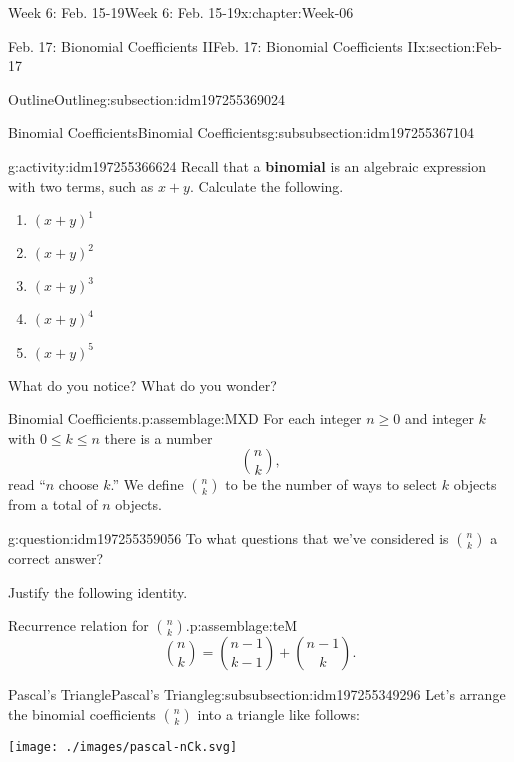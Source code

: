\documentclass[oneside,10pt,]{book}
\newcommand{\terminology}[1]{\textbf{#1}}
\numberwithin{equation}{section}
\renewcommand{\le}{\leqslant}
\renewcommand{\ge}{\geqslant}
\begin{document}
\begin{chapterptx}{Week 6: Feb. 15-19}{}{Week 6: Feb. 15-19}{}{}{x:chapter:Week-06}
\begin{sectionptx}{Feb. 17: Bionomial Coefficients II}{}{Feb. 17: Bionomial Coefficients II}{}{}{x:section:Feb-17}
\begin{subsectionptx}{Outline}{}{Outline}{}{}{g:subsection:idm197255369024}
\begin{subsubsectionptx}{Binomial Coefficients}{}{Binomial Coefficients}{}{}{g:subsubsection:idm197255367104}
\begin{activity}{}{g:activity:idm197255366624}%
Recall that a \terminology{binomial} is an algebraic expression with two terms, such as \(x+y\). Calculate the following.%
%
\begin{enumerate}
\item{}\(\displaystyle (x+y)^1\)%
\item{}\(\displaystyle (x+y)^2\)%
\item{}\(\displaystyle (x+y)^3\)%
\item{}\(\displaystyle (x+y)^4\)%
\item{}\(\displaystyle (x+y)^5\)%
\end{enumerate}
What do you notice? What do you wonder?%
\end{activity}%
\begin{assemblage}{Binomial Coefficients.}{p:assemblage:MXD}%
For each integer \(n \ge 0\) and integer \(k\) with \(0 \le k \le n\) there is a number%
\begin{equation*}
{n\choose k}\text{,}
\end{equation*}
read ``\(n\) choose \(k\).'' We define \({n \choose k}\) to be the number of ways to select \(k\) objects from a total of \(n\) objects.%
\end{assemblage}
\begin{question}{}{g:question:idm197255359056}%
To what questions that we've considered is \(\binom{n}{k}\) a correct answer?%
\end{question}
Justify the following identity.%
\begin{assemblage}{Recurrence relation for \({n \choose k}\).}{p:assemblage:teM}%
%
\begin{equation*}
{n \choose k} = {n-1 \choose k-1} + {n-1 \choose k}\text{.}
\end{equation*}
%
\end{assemblage}
\end{subsubsectionptx}
%
%
\typeout{************************************************}
\typeout{************************************************}
%
\begin{subsubsectionptx}{Pascal's Triangle}{}{Pascal's Triangle}{}{}{g:subsubsection:idm197255349296}
Let's arrange the binomial coefficients \({n \choose k}\) into a triangle like follows:%
\begin{sidebyside}{1}{0.15}{0.15}{0}%
\begin{sbspanel}{0.7}%
\texttt{[image: ./images/pascal-nCk.svg]}
\end{sbspanel}%

\end{sidebyside}
\end{subsubsectionptx}
\end{subsectionptx}
\end{sectionptx}
\end{chapterptx}
\end{document}

